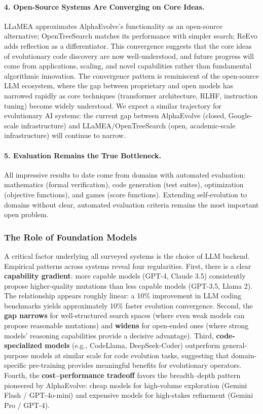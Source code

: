 \paragraph{4. Open-Source Systems Are Converging on Core Ideas.}
LLaMEA approximates AlphaEvolve's functionality as an open-source alternative; OpenTreeSearch matches its performance with simpler search; ReEvo adds reflection as a differentiator. This convergence suggests that the core ideas of evolutionary code discovery are now well-understood, and future progress will come from applications, scaling, and novel capabilities rather than fundamental algorithmic innovation. The convergence pattern is reminiscent of the open-source LLM ecosystem, where the gap between proprietary and open models has narrowed rapidly as core techniques (transformer architecture, RLHF, instruction tuning) become widely understood. We expect a similar trajectory for evolutionary AI systems: the current gap between AlphaEvolve (closed, Google-scale infrastructure) and LLaMEA/OpenTreeSearch (open, academic-scale infrastructure) will continue to narrow.

\paragraph{5. Evaluation Remains the True Bottleneck.}
All impressive results to date come from domains with automated evaluation: mathematics (formal verification), code generation (test suites), optimization (objective functions), and games (score functions). Extending self-evolution to domains without clear, automated evaluation criteria remains the most important open problem.


\subsubsection{The Role of Foundation Models}

A critical factor underlying all surveyed systems is the choice of LLM backend. Empirical patterns across systems reveal four regularities. First, there is a clear \textbf{capability gradient}: more capable models (GPT-4, Claude 3.5) consistently propose higher-quality mutations than less capable models (GPT-3.5, Llama 2). The relationship appears roughly linear: a 10\% improvement in LLM coding benchmarks yields approximately 10\% faster evolution convergence. Second, the \textbf{gap narrows} for well-structured search spaces (where even weak models can propose reasonable mutations) and \textbf{widens} for open-ended ones (where strong models' reasoning capabilities provide a decisive advantage). Third, \textbf{code-specialized models} (e.g., CodeLlama, DeepSeek-Coder) outperform general-purpose models at similar scale for code evolution tasks, suggesting that domain-specific pre-training provides meaningful benefits for evolutionary operators. Fourth, the \textbf{cost--performance tradeoff} favors the breadth--depth pattern pioneered by AlphaEvolve: cheap models for high-volume exploration (Gemini Flash / GPT-4o-mini) and expensive models for high-stakes refinement (Gemini Pro / GPT-4).

